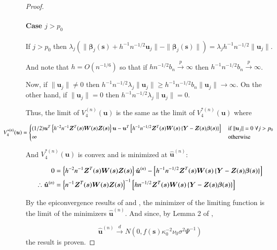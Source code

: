 \documentclass[authoryear, review, 11pt]{elsarticle}
\begin{document}
\begin{proof}
            \paragraph{Case $j > p_0$}
            If $j > p_0$ then $\lambda_j \left( \|\bm{\beta}_j(\bm{s}) + h^{-1} n^{-1/2} \bm{u}_j \| - \| \bm{\beta}_j(\bm{s}) \| \right) = \lambda_j h^{-1} n^{-1/2} \| \bm{u}_j \| $. 
        
            And note that $h = O(n^{-1/6})$ so that if $h n^{-1/2} b_n \xrightarrow{p} \infty$ then $h^{-1} n^{-1/2} b_n \xrightarrow{p} \infty$.
        
            Now, if $\| \bm{u}_j \| \ne 0$ then $h^{-1} n^{-1/2} \lambda_j \| \bm{u}_j \| \ge h^{-1} n^{-1/2} b_n \| \bm{u}_j \| \to \infty$. On the other hand, if $\| \bm{u}_j \| = 0$ then $h^{-1} n^{-1/2} \lambda_j \| \bm{u}_j \| = 0$.

            Thus, the limit of $V_4^{(n)} (\bm{u})$ is the same as the limit of $V_4^{*(n)} (\bm{u})$ where

            \begin{equation*}
                \mkern-72muV_4^{*(n)} (\bm{u}) = \begin{cases}(1/2) \bm{u}^T \left\{ h^{-2} n^{-1} \bm{Z}^T(\bm{s}) \bm{W}(\bm{s}) \bm{Z}(\bm{s}) \right\} \bm{u} - \bm{u}^T \left[ h^{-1} n^{-1/2} \bm{Z}^T(\bm{s}) \bm{W}(\bm{s}) \left\{ \bm{Y} - \bm{Z}(\bm{s}) \bm{\beta}(\bm{s}) \right\} \right] &\mbox{ if } \| \bm{u}_j \| = 0 \; \forall j > p_0 \\ \infty &\mbox{ otherwise } \end{cases}
            \end{equation*}


            And $V_4^{*(n)}(\bm{u})$ is convex and is minimized at $\hat{\bm{u}}^{(n)}$:

            \begin{align} \label{eq:limit}
                0 &=  \left\{ h^{-2} n^{-1} \bm{Z}^T(\bm{s}) \bm{W}(\bm{s}) \bm{Z}(\bm{s}) \right\} \hat{\bm{u}}^{(n)} - \left[ h^{-1} n^{-1/2} \bm{Z}^T(\bm{s}) \bm{W}(\bm{s}) \left\{ \bm{Y} - \bm{Z}(\bm{s}) \bm{\beta}(\bm{s}) \right\} \right] \notag \\
                \therefore \hat{\bm{u}}^{(n)} &= \left\{ n^{-1} \bm{Z}^T(\bm{s}) \bm{W}(\bm{s}) \bm{Z}(\bm{s}) \right\}^{-1} \left[ h n^{-1/2} \bm{Z}^T(\bm{s}) \bm{W}(\bm{s}) \left\{ \bm{Y} - \bm{Z}(\bm{s}) \bm{\beta}(\bm{s}) \right\} \right] \notag \\
            \end{align}

            By the epiconvergence results of \cite{Geyer-1994} and \cite{Knight-Fu-2000}, the minimizer of the limiting function is the limit of the minimizers $\hat{\bm{u}}^{(n)}$. And since, by Lemma 2 of \cite{Sun-Yan-Zhang-Lu-2014}, 

            \begin{equation}
                \hat{\bm{u}}^{(n)} \xrightarrow{d} N \left(0, f(\bm{s}) \kappa_0^{-2} \nu_0 \sigma^2 \Psi^{-1} \right)
            \end{equation}
            the result is proven.
        \end{proof}
\end{document}
